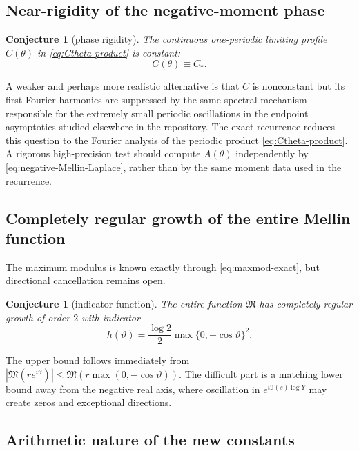 \documentclass[11pt,oneside]{article}
\newtheorem{conjecture}[theorem]{Conjecture}
\theoremstyle{definition}
\newcommand{\M}{\mathfrak M}
\begin{document}
\subsection{Near-rigidity of the negative-moment phase}

\begin{conjecture}[phase rigidity]\label{conj:phase-constant}
The continuous one-periodic limiting profile \(C(\theta)\) in
\cref{eq:Ctheta-product} is constant:
\begin{equation}\label{eq:Ctheta-conjecture}
 C(\theta)\equiv C_*.
\end{equation}
\end{conjecture}

A weaker and perhaps more realistic alternative is that \(C\) is nonconstant but its
first Fourier harmonics are suppressed by the same spectral mechanism responsible for
the extremely small periodic oscillations in the endpoint asymptotics studied elsewhere
in the repository.  The exact recurrence reduces this question to the Fourier analysis
of the periodic product \cref{eq:Ctheta-product}.  A rigorous high-precision
test should compute \(A(\theta)\) independently by \cref{eq:negative-Mellin-Laplace},
rather than by the same moment data used in the recurrence.

\subsection{Completely regular growth of the entire Mellin function}

The maximum modulus is known exactly through \cref{eq:maxmod-exact}, but directional
cancellation remains open.

\begin{conjecture}[indicator function]\label{conj:indicator}
The entire function \(\M\) has completely regular growth of order \(2\) with indicator
\begin{equation}\label{eq:indicator-conjecture}
 h(\vartheta)=\frac{\log2}{2}
 \max\{0,-\cos\vartheta\}^2.
\end{equation}
\end{conjecture}

The upper bound follows immediately from
\(|\M(re^{i\vartheta})|\le\M(r\max(0,-\cos\vartheta))\).  The difficult part is a
matching lower bound away from the negative real axis, where oscillation in
\(e^{i\Im(s)\log Y}\) may create zeros and exceptional directions.

\subsection{Arithmetic nature of the new constants}
\end{document}
